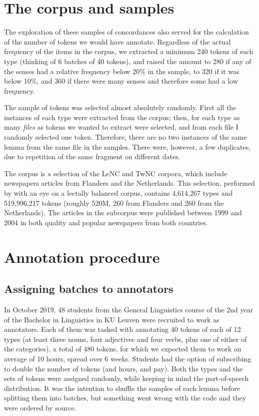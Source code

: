 \documentclass[
]{book}
\begin{document}
\hypertarget{corpus}{%
\section{The corpus and samples}\label{corpus}}

The exploration of these samples of concordances also served for the calculation of the number of tokens we would have annotate. Regardless of the actual frequency of the items in the corpus, we extracted a minimum 240 tokens of each type (thinking of 6 batches of 40 tokens), and raised the amount to 280 if any of the senses had a relative frequency below 20\% in the sample, to 320 if it was below 10\%, and 360 if there were many senses and therefore some had a low frequency.

The sample of tokens was selected almost absolutely randomly. First all the instances of each type were extracted from the corpus; then, for each type as many \emph{files} as tokens we wanted to extract were selected, and from each file I randomly selected one token. Therefore, there are no two instances of the same lemma from the same file in the samples. There were, however, a few duplicates, due to repetition of the same fragment on different dates.

The corpus is a selection of the LeNC and TwNC corpora, which include newspapers articles from Flanders and the Netherlands. This selection, performed by \textcite{depascale_2019} with an eye on a lectally balanced corpus, contains 4,614,267 types and 519,996,217 tokens (roughly 520M, 260 from Flanders and 260 from the Netherlands). The articles in the subcorpus were published between 1999 and 2004 in both quality and popular newspapers from both countries.

\hypertarget{annotation}{%
\section{Annotation procedure}\label{annotation}}

\hypertarget{assigning-batches-to-annotators}{%
\subsection{Assigning batches to annotators}\label{assigning-batches-to-annotators}}

In October 2019, 48 students from the General Linguistics course of the 2nd year of the Bachelor in Linguistics in KU Leuven were recruited to work as annotators. Each of them was tasked with annotating 40 tokens of each of 12 types (at least three nouns, four adjectives and four verbs, plus one of either of the categories), a total of 480 tokens, for which we expected them to work an average of 10 hours, spread over 6 weeks. Students had the option of subscribing to double the number of tokens (and hours, and pay). Both the types and the sets of tokens were assigned randomly, while keeping in mind the part-of-speech distribution. It was the intention to shuffle the samples of each lemma before splitting them into batches, but something went wrong with the code and they were ordered by source.
\end{document}
